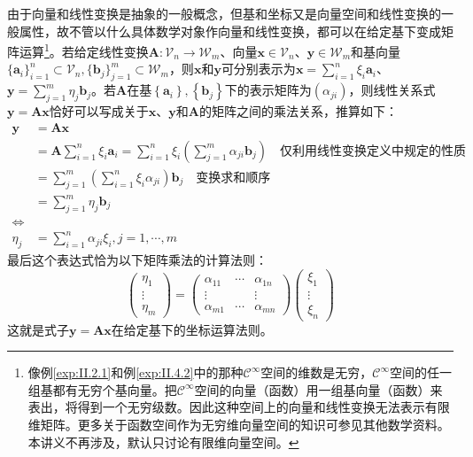 \documentclass[main.tex]{subfiles}
\begin{document}
由于向量和线性变换是抽象的一般概念，但基和坐标又是向量空间和线性变换的一般属性，故不管以什么具体数学对象作向量和线性变换，都可以在给定基下变成矩阵运算\footnote{像例\ref{exp:II.2.1}和例\ref{exp:II.4.2}中的那种$\mathcal{C}^\infty$空间的维数是无穷，$\mathcal{C}^\infty$空间的任一组基都有无穷个基向量。把$\mathcal{C}^\infty$空间的向量（函数）用一组基向量（函数）来表出，将得到一个无穷级数。因此这种空间上的向量和线性变换无法表示有限维矩阵。更多关于函数空间作为无穷维向量空间的知识可参见其他数学资料\cite{Hassani1999}。本讲义不再涉及，默认只讨论有限维向量空间。}。若给定线性变换$\mathbf{A}:\mathcal{V}_n\rightarrow\mathcal{W}_m$、向量$\mathbf{x}\in\mathcal{V}_n$、$\mathbf{y}\in\mathcal{W}_m$和基向量$\{\mathbf{a}_i\}_{i=1}^n\subset\mathcal{V}_n,\{\mathbf{b}_j\}_{j=1}^m\subset\mathcal{W}_m$，则$\mathbf{x}$和$\mathbf{y}$可分别表示为$\mathbf{x}=\sum_{i=1}^n\xi_i\mathbf{a}_i$、$\mathbf{y}=\sum_{j=1}^m\eta_j\mathbf{b}_j$。若$\mathbf{A}$在基$\left\{\mathbf{a}_i\right\},\left\{\mathbf{b}_j\right\}$下的表示矩阵为$\left(\alpha_{ji}\right)$，则线性关系式$\mathbf{y}=\mathbf{Ax}$恰好可以写成关于$\mathbf{x}$、$\mathbf{y}$和$\mathbf{A}$的矩阵之间的乘法关系，推算如下：
\begin{equation*}
\begin{split}
    \mathbf{y}&=\mathbf{Ax}\\
    &=\mathbf{A}\sum_{i=1}^n\xi_i\mathbf{a}_i=\sum_{i=1}^n\xi_i\left(\sum_{j=1}^m\alpha_{ji}\mathbf{b}_j\right)\quad\text{仅利用线性变换定义中规定的性质}\\
    &=\sum_{j=1}^m\left(\sum_{i=1}^n\xi_i\alpha_{ji}\right)\mathbf{b}_j\quad\text{变换求和顺序}\\
    &=\sum_{j=1}^m\eta_j\mathbf{b}_j\\
    \Leftrightarrow\\
    \eta_j&=\sum_{i=1}^n\alpha_{ji}\xi_i,j=1,\cdots,m
\end{split}
\end{equation*}
最后这个表达式恰为以下矩阵乘法的计算法则：
\[\left(\begin{array}{ccc}\eta_1\\\vdots\\\eta_m\end{array}\right)=\left(\begin{array}{ccc}\alpha_{11}&\cdots&\alpha_{1n}\\\vdots&&\vdots\\\alpha_{m1}&\cdots&\alpha_{mn}\end{array}\right)\left(\begin{array}{ccc}\xi_1\\\vdots\\\xi_n\end{array}\right)\]
这就是式子$\mathbf{y}=\mathbf{Ax}$在给定基下的坐标运算法则。
\end{document}

